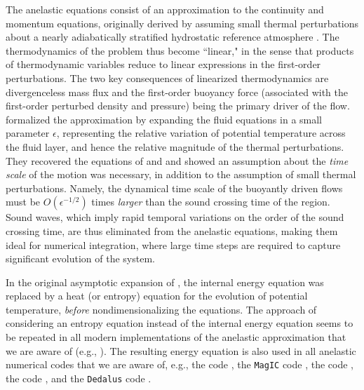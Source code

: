 \documentclass[12pt]{article}
\begin{document}
	The anelastic equations consist of an approximation to the continuity and momentum equations, originally derived by assuming small thermal perturbations about a nearly adiabatically stratified hydrostatic reference atmosphere \citep{Batchelor1953,Charney1960}. The thermodynamics of the problem thus become ``linear," in the sense that products of thermodynamic variables reduce to linear expressions in the first-order perturbations. The two key consequences of linearized thermodynamics are divergenceless mass flux and the first-order buoyancy force (associated with the first-order perturbed density and pressure) being the primary driver of the flow. \citet{Ogura1962} formalized the approximation by expanding the fluid equations in a small parameter $\epsilon$, representing the relative variation of potential temperature across the fluid layer, and hence the relative magnitude of the thermal perturbations. They recovered the equations of \citet{Batchelor1953} and \citet{Charney1960} and showed an assumption about the \textit{time scale} of the motion was necessary, in addition to the assumption of small thermal perturbations. Namely, the dynamical time scale of the buoyantly driven flows must be $O(\epsilon^{-1/2})$ times \textit{larger} than the sound crossing time of the region. Sound waves, which imply rapid temporal variations on the order of the sound crossing time, are thus eliminated from the anelastic equations, making them ideal for numerical integration, where large time steps are required to capture significant evolution of the system. 
	
	In the original asymptotic expansion of \citet{Ogura1962}, the internal energy equation was replaced by a heat (or entropy) equation for the evolution of potential temperature, \textit{before} nondimensionalizing the equations. The approach of considering an entropy equation instead of the internal energy equation seems to be repeated in all modern implementations of the anelastic approximation that we are aware of (e.g., \citealt{Gilman1981,Lipps1982,Glatzmaier1984,Lantz1992,Braginsky1995,Lantz1999,Clune1999,Rogers2005,Brown2012,Vasil2013,Wilczyski2022}). The resulting energy equation is also used in all anelastic numerical codes that we are aware of, e.g., the {\ash} code \citep{Brun2004}, the \texttt{MagIC} code \citep{Gastine2012}, the {\rayleigh} code \citep{Featherstone2016a,Featherstone2023}, the {\eulag} code \citep{Smolarkiewicz2004}, and the \texttt{Dedalus} code \citep{Burns2020,Brown2020}. 
	
\end{document}
